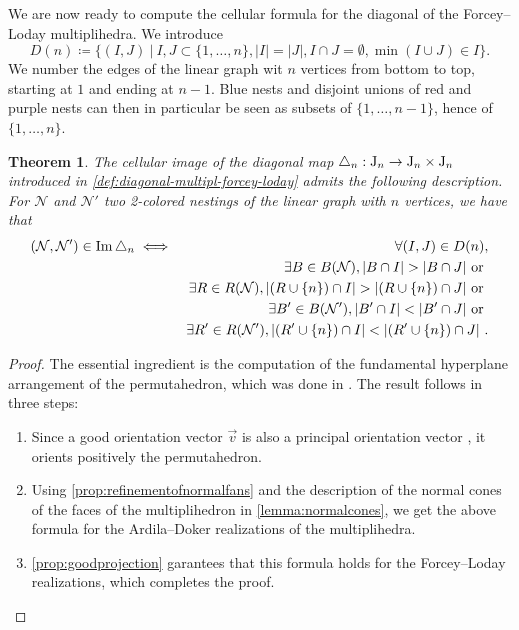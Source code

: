 \documentclass[twoside, 12pt]{amsart}
\newtheorem{theorem}{Theorem}
\theoremstyle{remark}
\begin{document}
We are now ready to compute the cellular formula for the diagonal of the Forcey--Loday multiplihedra. We introduce \[ D(n)\coloneqq \{(I,J) \ | \ I,J\subset\{1,\ldots,n\}, |I|=|J|, I\cap J=\emptyset, \min(I\cup J)\in I \}. \]
We number the edges of the linear graph wit $n$ vertices from bottom to top, starting at $1$ and ending at $n-1$. 
Blue nests and disjoint unions of red and purple nests can then in particular be seen as subsets of $\{1,\ldots,n-1\}$, hence of $\{1,\ldots,n\}$.

\begin{theorem}
\label{thm:formuladiagonal}
The cellular image of the diagonal map $\triangle_n : \mathrm{J}_n \to \mathrm{J}_n \times \mathrm{J}_n$ introduced in \cref{def:diagonal-multipl-forcey-loday} admits the following description.
For $\mathcal{N}$ and $\mathcal{N}'$ two 2-colored nestings of the linear graph with $n$ vertices, we have that
\begin{eqnarray*}
  (\mathcal{N},\mathcal{N}') \in \Ima\triangle_n 
  & \iff & \forall (I,J) \in D(n), \\
  && \exists B \in B(\mathcal{N}), |B\cap I|>|B\cap J| \text{ or }  \\
  && \exists R \in R(\mathcal{N}), |(R\cup \{n\}) \cap I|>| (R\cup \{n\}) \cap J| \text{ or }  \\
  && \exists B' \in B(\mathcal{N}'), |B'\cap I|<|B'\cap J| \text{ or } \nonumber \\
  && \exists R' \in R(\mathcal{N}'), |(R'\cup \{n\}) \cap I|<| (R'\cup \{n\}) \cap J| \ .
\end{eqnarray*}
\end{theorem}

\begin{proof} 
The essential ingredient is the computation of the fundamental hyperplane arrangement of the permutahedron, which was done in \cite[Section 3.1]{LA21}. The result follows in three steps:
\begin{enumerate}[leftmargin=*]
\item Since a good orientation vector $\vec v$ is also a principal orientation vector \cite[Definition 3.15]{LA21}, it orients positively the permutahedron. 
\item Using \cref{prop:refinementofnormalfans} and the description of the normal cones of the faces of the multiplihedron in \cref{lemma:normalcones}, we get the above formula for the Ardila--Doker realizations of the multiplihedra. 
\item \cref{prop:goodprojection} garantees that this formula holds for the Forcey--Loday realizations, which completes the proof.
\end{enumerate}
\end{proof}
\end{document}
